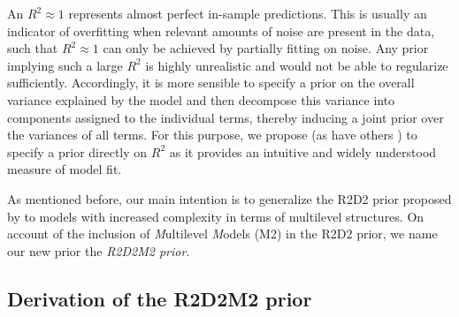 An $R^2 \approx 1$ represents almost perfect in-sample predictions. This is usually an indicator of overfitting when relevant amounts of noise are present in the data, such that $R^2 \approx 1$ can only be achieved by partially fitting on noise. Any prior implying such a large $R^2$ is highly unrealistic and would not be able to regularize sufficiently. Accordingly, it is more sensible to specify a prior on the overall variance explained by the model and then decompose this variance into components assigned to the individual terms, thereby inducing a joint prior over the variances of all terms. For this purpose, we propose (as have others \citep{rstanarm,r2d2zhang}) to specify a prior directly on $R^2$ as it provides an intuitive and widely understood measure of model fit.

As mentioned before, our main intention is to generalize the R2D2 prior proposed by \cite{r2d2zhang} to models with increased complexity in terms of multilevel structures. On account of the inclusion of \emph{M}ultilevel \emph{M}odels (M2) in the R2D2 prior, we name our new prior the \emph{R2D2M2 prior}. \\


\subsection{Derivation of the R2D2M2 prior}

